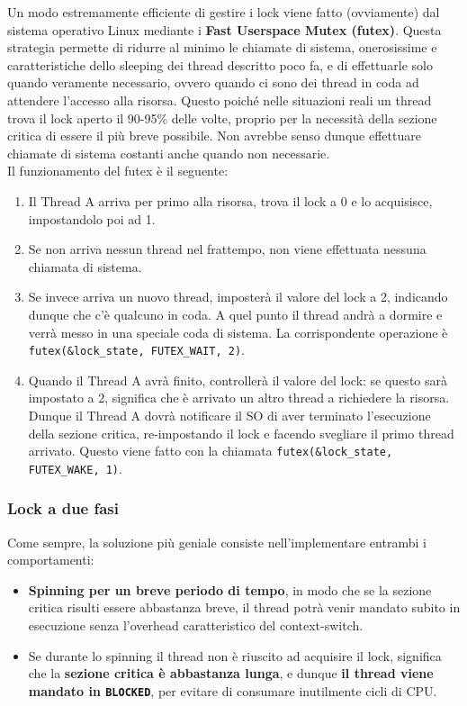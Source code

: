 \documentclass[12pt]{report}
\begin{document}
	Un modo estremamente efficiente di gestire i lock viene fatto (ovviamente) dal sistema operativo Linux mediante i \textbf{Fast Userspace Mutex (futex)}. Questa strategia permette di ridurre al minimo le chiamate di sistema, onerosissime e caratteristiche dello sleeping dei thread descritto poco fa, e di effettuarle solo quando veramente necessario, ovvero quando ci sono dei thread in coda ad attendere l'accesso alla risorsa. Questo poiché nelle situazioni reali un thread trova il lock aperto il 90-95\% delle volte, proprio per la necessità della sezione critica di essere il più breve possibile. Non avrebbe senso dunque effettuare chiamate di sistema costanti anche quando non necessarie.\\
	Il funzionamento del futex è il seguente:
	\begin{enumerate}
		\item Il Thread A arriva per primo alla risorsa, trova il lock a 0 e lo acquisisce, impostandolo poi ad 1.
		
		\item Se non arriva nessun thread nel frattempo, non viene effettuata nessuna chiamata di sistema.
		
		\item Se invece arriva un nuovo thread, imposterà il valore del lock a 2, indicando dunque che c'è qualcuno in coda. A quel punto il thread andrà a dormire e verrà messo in una speciale coda di sistema. La corrispondente operazione è \texttt{futex(\&lock\_state, FUTEX\_WAIT, 2)}.
		
		\item Quando il Thread A avrà finito, controllerà il valore del lock: se questo sarà impostato a 2, significa che è arrivato un altro thread a richiedere la risorsa. Dunque il Thread A dovrà notificare il SO di aver terminato l'esecuzione della sezione critica, re-impostando il lock e facendo svegliare il primo thread arrivato. Questo viene fatto con la chiamata \texttt{futex(\&lock\_state, FUTEX\_WAKE, 1)}.
	\end{enumerate}
	
	\subsubsection*{Lock a due fasi}
	Come sempre, la soluzione più geniale consiste nell'implementare entrambi i comportamenti:
	\begin{itemize}
		\item \textbf{Spinning per un breve periodo di tempo}, in modo che se la sezione critica risulti essere abbastanza breve, il thread potrà venir mandato subito in esecuzione senza l'overhead caratteristico del context-switch.
		
		\item Se durante lo spinning il thread non è riuscito ad acquisire il lock, significa che la \textbf{sezione critica è abbastanza lunga}, e dunque \textbf{il thread viene mandato in \texttt{BLOCKED}}, per evitare di consumare inutilmente cicli di CPU.
	\end{itemize}
	
\end{document}
